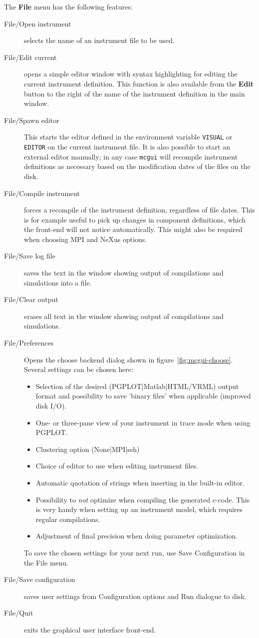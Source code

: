 The \textbf{File} menu has the following features:
\begin{description}
\item[File/Open instrument] selects the name of an instrument file to be used.
\item[File/Edit current] opens a simple editor window with \MCS syntax
  highlighting for editing the
  current instrument definition. This function is also available from
  the \textbf{Edit} button to the right of the name of the instrument definition in
  the main window.
\item[File/Spawn editor] This starts the editor defined in the environment
  variable \verb+VISUAL+ or \verb+EDITOR+ on the current instrument
  file. It is also possible to start an external editor manually; in any
  case \verb+mcgui+ will recompile instrument definitions as necessary based on
  the modification dates of the files on the disk.
\item[File/Compile instrument] forces a recompile of the instrument definition,
  regardless of file dates. This is for example useful to pick up changes in
  component definitions, which the front-end will not notice automatically. This
  might also be required when choosing MPI  and NeXus options.
\item[File/Save log file] saves the text in the window showing output of
  compilations and simulations into a file.
\item[File/Clear output] erases all text in the window showing output of
  compilations and simulations.
  \item[File/Preferences] Opens the choose backend dialog shown in
  figure~\ref{fig:mcgui-choose}. Several settings can be chosen here:
\begin{itemize}
  \item Selection of  the desired (PGPLOT|Matlab|HTML/VRML) output
    format and possibility to save 'binary files' when
  applicable (improved disk I/O).
  \item One- or three-pane view of your instrument in trace mode when
    using PGPLOT.
  \item Clustering option (None|MPI|ssh)
  \item Choice of editor to use when editing instrument files.
  \item Automatic quotation of strings when inserting in the built-in
    editor.
  \item Possibility to \emph{not} optimize when compiling the generated
    c-code. This is very handy when setting up an instrument model, which
    requires regular compilations.
  \item Adjustment of final precision when doing parameter optimization.
\end{itemize}
To save the chosen settings for your next \MCS run, use Save
Configuration in the File menu.
\item[File/Save configuration] saves user settings from Configuration
  options and Run dialogue to disk.
\item[File/Quit] exits the graphical user interface front-end.
\end{description}

